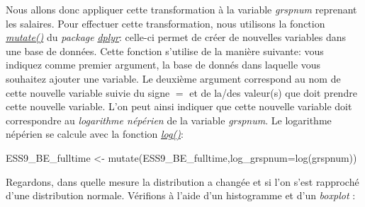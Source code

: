 \documentclass[
]{book}
\newenvironment{Shaded}{\begin{snugshade}}{\end{snugshade}}
\newcommand{\AttributeTok}[1]{\textcolor[rgb]{0.77,0.63,0.00}{#1}}
\newcommand{\CommentTok}[1]{\textcolor[rgb]{0.56,0.35,0.01}{\textit{#1}}}
\newcommand{\DecValTok}[1]{\textcolor[rgb]{0.00,0.00,0.81}{#1}}
\newcommand{\FunctionTok}[1]{\textcolor[rgb]{0.00,0.00,0.00}{#1}}
\newcommand{\NormalTok}[1]{#1}
\newcommand{\OtherTok}[1]{\textcolor[rgb]{0.56,0.35,0.01}{#1}}
\newcommand{\SpecialCharTok}[1]{\textcolor[rgb]{0.00,0.00,0.00}{#1}}
\newcommand{\StringTok}[1]{\textcolor[rgb]{0.31,0.60,0.02}{#1}}
\begin{document}
Nous allons donc appliquer cette transformation à la variable \emph{grspnum} reprenant les salaires. Pour effectuer cette transformation, nous utilisons la fonction \href{https://dplyr.tidyverse.org/reference/mutate.html}{\emph{mutate()}} du \emph{package} \href{https://dplyr.tidyverse.org/}{\emph{dplyr}}: celle-ci permet de créer de nouvelles variables dans une base de données. Cette fonction s'utilise de la manière suivante: vous indiquez comme premier argument, la base de donnés dans laquelle vous souhaitez ajouter une variable. Le deuxième argument correspond au nom de cette nouvelle variable suivie du signe \(=\) et de la/des valeur(s) que doit prendre cette nouvelle variable. L'on peut ainsi indiquer que cette nouvelle variable doit correspondre au \emph{logarithme népérien} de la variable \emph{grspnum}. Le logarithme népérien se calcule avec la fonction \href{https://www.rdocumentation.org/packages/base/versions/3.6.2/topics/log}{\emph{log()}}:

\begin{Shaded}
\begin{Highlighting}[]
\NormalTok{ESS9\_BE\_fulltime }\OtherTok{\textless{}{-}} \FunctionTok{mutate}\NormalTok{(ESS9\_BE\_fulltime,}\AttributeTok{log\_grspnum=}\FunctionTok{log}\NormalTok{(grspnum))}
\end{Highlighting}
\end{Shaded}

Regardons, dans quelle mesure la distribution a changée et si l'on s'est rapproché d'une distribution normale. Vérifions à l'aide d'un histogramme et d'un \emph{boxplot} :

\begin{Shaded}
\end{Shaded}
\end{document}
